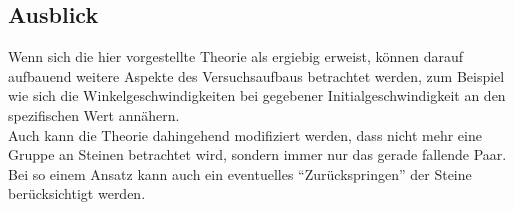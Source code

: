 \subsection{Ausblick}
Wenn sich die hier vorgestellte Theorie als ergiebig erweist, können darauf
aufbauend weitere Aspekte des Versuchsaufbaus betrachtet werden, zum Beispiel
wie sich die Winkelgeschwindigkeiten bei gegebener Initialgeschwindigkeit an
den spezifischen Wert annähern.\\
Auch kann die Theorie dahingehend modifiziert werden, dass nicht mehr eine
Gruppe an Steinen betrachtet wird, sondern immer nur das gerade fallende Paar.
Bei so einem Ansatz kann auch ein eventuelles ``Zurückspringen'' der Steine berücksichtigt werden.
